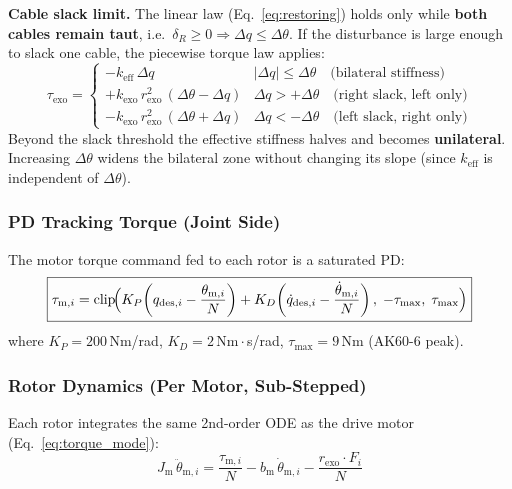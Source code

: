 \documentclass[11pt,a4paper]{article}
\newcommand{\Jm}{J_{\mathrm{m}}}
\begin{document}
\begin{warnbox}
\textbf{Cable slack limit.}
The linear law (Eq.~\ref{eq:restoring}) holds only while \textbf{both cables
remain taut}, i.e.\ $\delta_R \geq 0 \Rightarrow \Delta q \leq \Delta\theta$.
If the disturbance is large enough to slack one cable, the piecewise torque
law applies:
\[
    \tau_{\mathrm{exo}} =
    \begin{cases}
        -k_{\mathrm{eff}}\,\Delta q
          & |\Delta q| \leq \Delta\theta \quad\text{(bilateral stiffness)} \\[6pt]
        +k_{\mathrm{exo}}\,r_{\mathrm{exo}}^{2}\,(\Delta\theta - \Delta q)
          & \Delta q > +\Delta\theta \quad\text{(right slack, left only)} \\[6pt]
        -k_{\mathrm{exo}}\,r_{\mathrm{exo}}^{2}\,(\Delta\theta + \Delta q)
          & \Delta q < -\Delta\theta \quad\text{(left slack, right only)}
    \end{cases}
\]
Beyond the slack threshold the effective stiffness halves and becomes
\textbf{unilateral}.  Increasing $\Delta\theta$ widens the bilateral zone
without changing its slope (since $k_{\mathrm{eff}}$ is independent of
$\Delta\theta$).
\end{warnbox}


\subsubsection{PD Tracking Torque (Joint Side)}

The motor torque command fed to each rotor is a saturated PD:
\begin{equation}
\boxed{
    \tau_{\mathrm{m},i} = \mathrm{clip}\!\Bigl(
        K_P\!\left(q_{\mathrm{des},i} - \frac{\theta_{\mathrm{m},i}}{N}\right)
      + K_D\!\left(\dot{q}_{\mathrm{des},i} - \frac{\dot{\theta}_{\mathrm{m},i}}{N}\right),\;
      -\tau_{\max},\; \tau_{\max}
    \Bigr)
}
\label{eq:exo_pd}
\end{equation}
where $K_P = 200$\,Nm/rad, $K_D = 2$\,Nm\,$\cdot$\,s/rad, $\tau_{\max} = 9$\,Nm (AK60-6 peak).

\subsubsection{Rotor Dynamics (Per Motor, Sub-Stepped)}

Each rotor integrates the same 2nd-order ODE as the drive motor
(Eq.~\ref{eq:torque_mode}):
\begin{equation}
    \Jm\,\ddot{\theta}_{\mathrm{m},i}
      = \frac{\tau_{\mathrm{m},i}}{N}
      - b_{\mathrm{m}}\,\dot{\theta}_{\mathrm{m},i}
      - \frac{r_{\mathrm{exo}} \cdot F_i}{N}
\label{eq:exo_rotor}
\end{equation}
\end{document}
